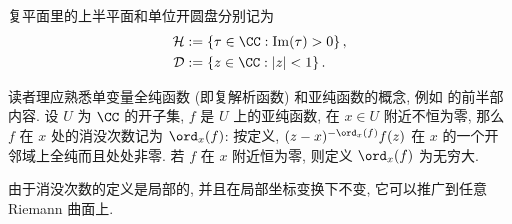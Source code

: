 复平面里的上半平面和单位开圆盘分别记为
\begin{align*}
	\mathcal{H} & := \left\{ \tau \in \CC: \Im(\tau) > 0 \right\}, \\
	\mathcal{D} & := \left\{ z \in \CC: |z| < 1 \right\}.
\end{align*}

读者理应熟悉单变量全纯函数 (即复解析函数) 和亚纯函数的概念, 例如 \cite{TW06} 的前半部内容. 设 $U$ 为 $\CC$ 的开子集, $f$ 是 $U$ 上的亚纯函数, 在 $x \in U$ 附近不恒为零, 那么 $f$ 在 $x$ 处的消没次数记为 $\ord_x(f)$: 按定义, $(z-x)^{-\ord_x(f)} f(z)$ 在 $x$ 的一个开邻域上全纯而且处处非零. 若 $f$ 在 $x$ 附近恒为零, 则定义 $\ord_x(f)$ 为无穷大.

由于消没次数的定义是局部的, 并且在局部坐标变换下不变, 它可以推广到任意 Riemann 曲面上.
